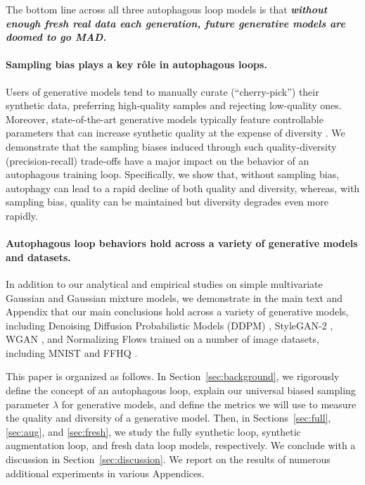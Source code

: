 \documentclass{article}
\def\bias{{\lambda}}
\def\colorSynthetic{colorA}
\def\colorMixed{colorB}
\def\colorFresh{colorC}
\def\synthetic{\textcolor{\colorSynthetic}{fully synthetic loop}}
\def\mixed{\textcolor{\colorMixed}{synthetic augmentation loop}}
\def\fresh{\textcolor{\colorFresh}{fresh data loop}}
\begin{document}
The bottom line across all three autophagous loop models is that {\bf\em without enough fresh real data each generation, future generative models are doomed to go MAD.}


\paragraph{Sampling bias plays a key r\^{o}le in autophagous loops.} 
%
Users of generative models tend to manually curate (``cherry-pick'') their synthetic data, preferring high-quality samples and rejecting low-quality ones.
Moreover, state-of-the-art generative models typically feature controllable parameters that can increase synthetic quality at the expense of diversity \cite{Karras2019stylegan2, classifier_free_guidance}.
We demonstrate that the sampling biases induced through such quality-diversity (precision-recall) trade-offs have a major impact on the behavior of an autophagous training loop. 
Specifically, we show that, without sampling bias, autophagy can lead to a rapid decline of both quality and diversity, whereas, with sampling bias, quality can be maintained but diversity degrades even more rapidly.


\paragraph{Autophagous loop behaviors hold across a variety of generative models and datasets.} 
%
In addition to our analytical and empirical studies on simple multivariate Gaussian and Gaussian mixture models, we demonstrate in the main text and Appendix that our main conclusions hold across a variety of
generative models, including 
Denoising Diffusion Probabilistic Models (DDPM) \cite{ddpm}, 
StyleGAN-2 \cite{Karras2019stylegan2},
WGAN \cite{wgan_gp}, 
and Normalizing Flows \cite{normalizing_flow}
trained on a number of image datasets, including MNIST \cite{MNIST}
and FFHQ \cite{kass1997geometrical}.


\medskip
This paper is organized as follows.  
In Section~\ref{sec:background}, we rigorously define the concept of an autophagous loop, explain our universal biased sampling parameter $\bias$ for generative models, and define the metrics we will use to measure the quality
and diversity
of a generative model.
Then, in Sections~\ref{sec:full}, \ref{sec:aug}, and \ref{sec:fresh}, 
we study the \synthetic{}, \mixed{}, and \fresh{} models, respectively.
We conclude with a discussion in Section~\ref{sec:discussion}.
We report on the results of numerous additional experiments in various Appendices.
\end{document}
